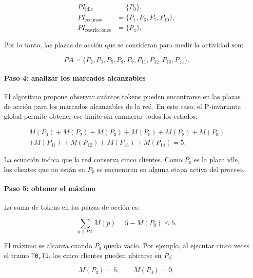 \documentclass[11pt,a4paper]{article}
\begin{document}
\begin{align*}
    PI_{\mathrm{idle}} &= \{P_0\},\\
    PI_{\mathrm{recursos}} &= \{P_1,P_6,P_7,P_{10}\},\\
    PI_{\mathrm{restricciones}} &= \{P_4\}.
\end{align*}

Por lo tanto, las plazas de acción que se consideran para medir la actividad
son:

\begin{equation}
    PA =
    \{P_2,P_3,P_5,P_8,P_9,P_{11},P_{12},P_{13},P_{14}\}.
\end{equation}

\paragraph{Paso 4: analizar los marcados alcanzables}

El algoritmo propone observar cuántos tokens pueden encontrarse en las plazas
de acción para los marcados alcanzables de la red. En este caso, el P-invariante
global permite obtener ese límite sin enumerar todos los estados:

\begin{equation}
\begin{split}
    M(P_0)+M(P_2)+M(P_3)+M(P_5)+M(P_8)+M(P_9)\\
    +M(P_{11})+M(P_{12})+M(P_{13})+M(P_{14})=5.
\end{split}
\end{equation}

La ecuación indica que la red conserva cinco clientes. Como $P_0$ es la plaza
idle, los clientes que no están en $P_0$ se encuentran en alguna etapa activa
del proceso.

\paragraph{Paso 5: obtener el máximo}

La suma de tokens en las plazas de acción es:

\begin{equation}
    \sum_{p\in PA}M(p)=5-M(P_0)\leq5.
\end{equation}

El máximo se alcanza cuando $P_0$ queda vacío. Por ejemplo, al ejecutar cinco
veces el tramo \texttt{T0,T1}, los cinco clientes pueden ubicarse en $P_3$:

\begin{equation}
    M(P_3)=5,\qquad M(P_0)=0,
\end{equation}
\end{document}
